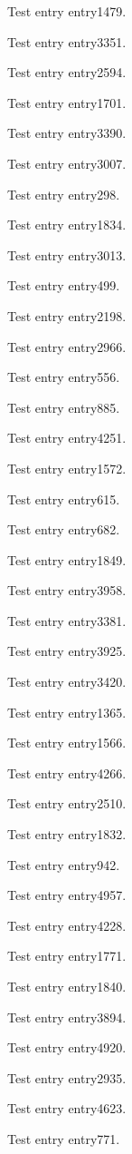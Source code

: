 Test entry \gls{entry1479}.

Test entry \gls{entry3351}.

Test entry \gls{entry2594}.

Test entry \gls{entry1701}.

Test entry \gls{entry3390}.

Test entry \gls{entry3007}.

Test entry \gls{entry298}.

Test entry \gls{entry1834}.

Test entry \gls{entry3013}.

Test entry \gls{entry499}.

Test entry \gls{entry2198}.

Test entry \gls{entry2966}.

Test entry \gls{entry556}.

Test entry \gls{entry885}.

Test entry \gls{entry4251}.

Test entry \gls{entry1572}.

Test entry \gls{entry615}.

Test entry \gls{entry682}.

Test entry \gls{entry1849}.

Test entry \gls{entry3958}.

Test entry \gls{entry3381}.

Test entry \gls{entry3925}.

Test entry \gls{entry3420}.

Test entry \gls{entry1365}.

Test entry \gls{entry1566}.

Test entry \gls{entry4266}.

Test entry \gls{entry2510}.

Test entry \gls{entry1832}.

Test entry \gls{entry942}.

Test entry \gls{entry4957}.

Test entry \gls{entry4228}.

Test entry \gls{entry1771}.

Test entry \gls{entry1840}.

Test entry \gls{entry3894}.

Test entry \gls{entry4920}.

Test entry \gls{entry2935}.

Test entry \gls{entry4623}.

Test entry \gls{entry771}.

